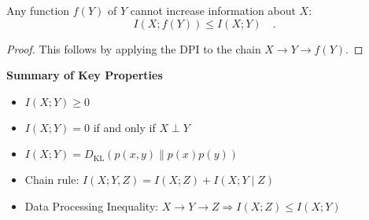 \documentclass[../../main.tex]{subfiles}
\begin{document}
\begin{corollary}
    Any function \( f(Y) \) of \( Y \) cannot increase information about \( X \):
    \[
        I(X; f(Y)) \leq I(X; Y) \quad .
    \]
\end{corollary}
\begin{proof}
    This follows by applying the DPI to the chain \( X \to Y \to f(Y) \).
\end{proof}

\textbf{Summary of Key Properties}
\begin{itemize}[leftmargin=1.2cm]
    \item \( I(X; Y) \geq 0 \)
    \item \( I(X; Y) = 0 \) if and only if \( X \perp Y \)
    \item \( I(X; Y) = D_{\mathrm{KL}}(p(x, y) \| p(x)p(y)) \)
    \item Chain rule: \( I(X; Y, Z) = I(X; Z) + I(X; Y \mid Z) \)
    \item Data Processing Inequality: \( X \to Y \to Z \Rightarrow I(X; Z) \leq I(X; Y) \)
\end{itemize}
\end{document}
